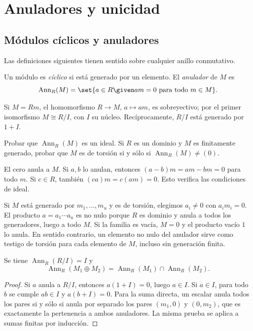 \section{Anuladores y unicidad}
\subsection{Módulos cíclicos y anuladores}
Las definiciones siguientes tienen sentido sobre cualquier anillo conmutativo.
\begin{defi}
Un módulo es \emph{cíclico} si está generado por un elemento. El \emph{anulador} de $M$ es
\[
\operatorname{Ann}_R(M)
=\set{a\in R\given am=0\text{ para todo }m\in M}.
\]
\end{defi}
Si $M=Rm$, el homomorfismo $R\to M$, $a\mapsto am$, es sobreyectivo; por el primer isomorfismo $M\cong R/I$, con $I$ su núcleo. Recíprocamente, $R/I$ está generado por $1+I$.

\begin{ejer}[Remisión a VI.4.4]\label{ejer:C21-anulador}
Probar que $\operatorname{Ann}_R(M)$ es un ideal. Si $R$ es un dominio y $M$ es finitamente generado, probar que $M$ es de torsión si y sólo si $\operatorname{Ann}_R(M)\ne(0)$.
\end{ejer}
\begin{sol}
El cero anula a $M$. Si $a,b$ lo anulan, entonces $(a-b)m=am-bm=0$ para todo $m$. Si $c\in R$, también $(ca)m=c(am)=0$. Esto verifica las condiciones de ideal.

Si $M$ está generado por $m_1,\ldots,m_u$ y es de torsión, elegimos $a_i\ne0$ con $a_im_i=0$. El producto $a=a_1\cdots a_u$ es no nulo porque $R$ es dominio y anula a todos los generadores, luego a todo $M$. Si la familia es vacía, $M=0$ y el producto vacío $1$ lo anula. En sentido contrario, un elemento no nulo del anulador sirve como testigo de torsión para cada elemento de $M$, incluso sin generación finita.
\end{sol}

\begin{lema}\label{lema:C21-anuladores}
Se tiene $\operatorname{Ann}_R(R/I)=I$ y
\[
\operatorname{Ann}_R(M_1\oplus M_2)
=\operatorname{Ann}_R(M_1)\cap\operatorname{Ann}_R(M_2).
\]
\end{lema}
\begin{proof}
Si $a$ anula a $R/I$, entonces $a(1+I)=0$, luego $a\in I$. Si $a\in I$, para todo $b$ se cumple $ab\in I$ y $a(b+I)=0$. Para la suma directa, un escalar anula todos los pares si y sólo si anula por separado los pares $(m_1,0)$ y $(0,m_2)$, que es exactamente la pertenencia a ambos anuladores. La misma prueba se aplica a sumas finitas por inducción.
\end{proof}

